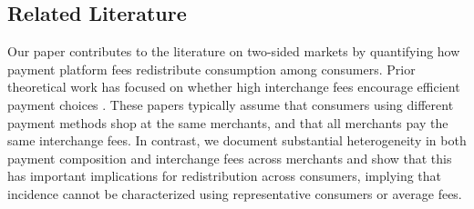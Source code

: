 \documentclass[main.tex]{subfiles}
\begin{document}

\subsection{Related Literature}

Our paper contributes to the literature on two-sided markets by quantifying how payment platform fees redistribute consumption among consumers.
Prior theoretical work has focused on whether high interchange fees encourage efficient payment choices \citep{Rochet.Tirole2011,Wright2012,Edelman.Wright2015}.
These papers typically assume that consumers using different payment methods shop at the same merchants, and that all merchants pay the same interchange fees.
In contrast, we document substantial heterogeneity in both payment composition and interchange fees across merchants and show that this has important implications for redistribution across consumers, implying that incidence cannot be characterized using representative consumers or average fees.
\end{document}
